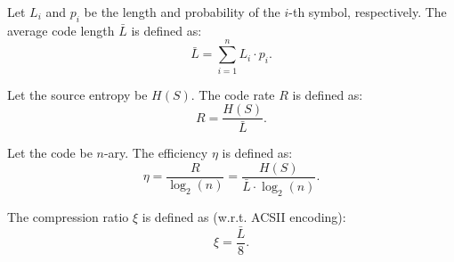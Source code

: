 \documentclass[12pt,twoside]{article}
\begin{document}
\begin{appendices}
Let $L_i$ and $p_i$ be the length and probability of the $i$-th symbol, respectively. The average code length $\bar{L}$ is defined as:
\begin{equation}
    \bar{L} = \sum_{i=1}^{n} L_i \cdot p_i.
\end{equation}

Let the source entropy be $H(S)$. The code rate $R$ is defined as:
\begin{equation}
    R = \frac{H(S)}{\bar{L}}.
\end{equation}

Let the code be $n$-ary. The efficiency $\eta$ is defined as:
\begin{equation}
    \eta = \frac{R}{\log_2(n)} = \frac{H(S)}{\bar{L} \cdot \log_2(n)}.
\end{equation}

The compression ratio $\xi$ is defined as (w.r.t. ACSII encoding):
\begin{equation}
    \xi = \frac{\bar{L}}{8}.
\end{equation}

\end{appendices}
\end{document}

